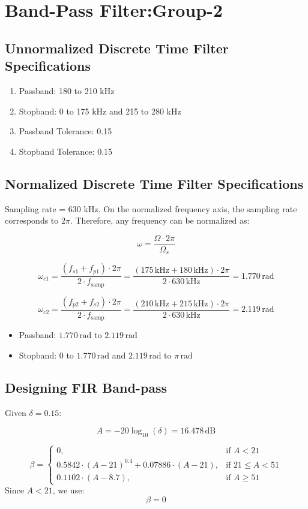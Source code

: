 \documentclass[12pt]{article}
\begin{document}
\section{Band-Pass Filter:Group-2}
\subsection{Unnormalized Discrete Time Filter Specifications}
\begin{enumerate}
    \item Passband: 180 to 210 kHz
    \item Stopband: 0 to 175 kHz and 215 to 280 kHz
    \item Passband Tolerance: 0.15
    \item Stopband Tolerance: 0.15
\end{enumerate}

\subsection{Normalized Discrete Time Filter Specifications}
Sampling rate = 630 kHz. On the normalized frequency axis, the sampling rate corresponds to \( 2\pi \). Therefore, any frequency can be normalized as:

\[
\omega = \frac{\Omega \cdot 2\pi}{\Omega_s}
\]

\[
\omega_{c1} = \frac{(f_{s1} + f_{p1}) \cdot 2\pi}{2 \cdot f_{\text{samp}}}
= \frac{(175\,\text{kHz} + 180\,\text{kHz}) \cdot 2\pi}{2 \cdot 630\,\text{kHz}}
= 1.770\,\text{rad}
\]

\[
\omega_{c2} = \frac{(f_{p2} + f_{s2}) \cdot 2\pi}{2 \cdot f_{\text{samp}}}
= \frac{(210\,\text{kHz} + 215\,\text{kHz}) \cdot 2\pi}{2 \cdot 630\,\text{kHz}}
= 2.119\,\text{rad}
\]

\begin{itemize}
    \item Passband: \(1.770\,\text{rad}\) to \(2.119\,\text{rad}\)
    \item Stopband: \(0\) to \(1.770\,\text{rad}\) and \(2.119\,\text{rad}\) to \(\pi\,\text{rad}\)
\end{itemize}

\subsection{Designing FIR Band-pass}
Given \( \delta = 0.15 \):

\[
A = -20 \log_{10}(\delta) = 16.478 \, \text{dB}
\]

\[
\beta =
\begin{cases}
0, & \text{if } A < 21 \\
0.5842 \cdot (A - 21)^{0.4} + 0.07886 \cdot (A - 21), & \text{if } 21 \leq A < 51 \\
0.1102 \cdot (A - 8.7), & \text{if } A \geq 51
\end{cases}
\]
Since \( A < 21 \), we use:
\[
\beta = 0
\]
\end{document}

